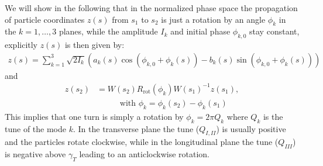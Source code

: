 We will show in the following that in the normalized phase space the propagation of particle coordinates $z(s)$ from $s_1$ to $s_2$ is just a rotation by an angle $\phi_k$ in the $k=1,\ldots,3$ planes, while the amplitude $I_k$ and initial phase $\phi_{k,0}$ stay constant, explicitly $z(s)$ is then given by:
\begin{align}\label{opt:eqn:3:3}
z(s)=\sum_{k=1}^3 \sqrt{2I_k}\left(
a_k(s) \cos \left(\phi_{k,0} + \phi_k(s)\right) -
b_k(s) \sin \left(\phi_{k,0} + \phi_k(s)\right)
\right)
\end{align}
and
\begin{align}
z(s_2)&=W(s_2)R_{\mathrm{rot}}(\phi_k)W(s_1)^{-1}z(s_1), \\
&\hspace{30pt} \text{ with } \phi_k=\phi_k(s_2)-\phi_k(s_1)\nonumber
\end{align}
This implies that one turn is simply a rotation by $\phi_k=2\pi Q_k$ where $Q_k$ is the tune of the mode $k$. In the transverse plane the tune ($Q_{I,II}$) is usually positive and the particles rotate clockwise, while in the longitudinal plane the tune ($Q_{III}$) is negative above $\gamma_T$ leading to an anticlockwise rotation.

